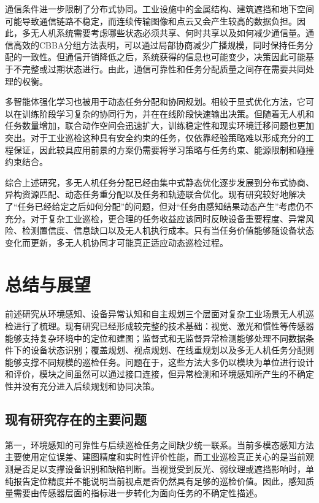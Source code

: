 通信条件进一步限制了分布式协同。工业设施中的金属结构、建筑遮挡和地下空间可能导致通信链路不稳定，而连续传输图像和点云又会产生较高的数据负担。因此，多无人机系统需要考虑哪些状态必须共享、何时共享以及如何减少通信量。通信高效的CBBA分组方法表明，可以通过局部协商减少广播规模，同时保持任务分配的一致性\cite{Kim2020,fei2022limitedcomm,pan2024uhcrp}。但通信开销降低之后，系统获得的信息也可能变少，决策因此可能基于不完整或过期状态进行。由此，通信可靠性和任务分配质量之间存在需要共同处理的权衡。

多智能体强化学习也被用于动态任务分配和协同规划。相较于显式优化方法，它可以在训练阶段学习复杂的协同行为，并在在线阶段快速输出决策。但随着无人机和任务数量增加，联合动作空间会迅速扩大，训练稳定性和现实环境迁移问题也更加突出。对于工业巡检这种具有安全约束的任务，仅依靠经验策略难以形成充分的工程保证，因此较具应用前景的方案仍需要将学习策略与任务约束、能源限制和碰撞约束结合\cite{westheider2023multiipp,kulkarni2022teamed}。

综合上述研究，多无人机任务分配已经由集中式静态优化逐步发展到分布式协商、异构资源匹配、动态任务重分配以及任务和轨迹联合优化。现有研究较好地解决了“任务已经给定之后如何分配”的问题，但对“任务由感知结果动态产生”考虑仍不充分。对于复杂工业巡检，更合理的任务收益应该同时反映设备重要程度、异常风险、检测置信度、信息缺口以及无人机执行成本。只有当任务价值能够随设备状态变化而更新，多无人机协同才可能真正适应动态巡检过程。

\section{总结与展望}

前述研究从环境感知、设备异常认知和自主规划三个层面对复杂工业场景无人机巡检进行了梳理。现有研究已经形成较完整的技术基础：视觉、激光和惯性等传感器能够支持复杂环境中的定位和建图；监督式和无监督异常检测能够处理不同数据条件下的设备状态识别；覆盖规划、视点规划、在线重规划以及多无人机任务分配则能够支撑不同规模的巡检任务。问题在于，这些方法大多仍以模块为单位进行设计和评价，模块之间虽然可以通过接口连接，但异常检测和环境感知所产生的不确定性并没有充分进入后续规划和协同决策。

\subsection{现有研究存在的主要问题}

第一，环境感知的可靠性与后续巡检任务之间缺少统一联系。当前多模态感知方法主要使用定位误差、建图精度和实时性评价性能，而工业巡检真正关心的是当前观测是否足以支撑设备识别和缺陷判断。当视觉受到反光、弱纹理或遮挡影响时，单纯报告定位精度并不能说明当前视点是否仍然具有足够的巡检价值。因此，感知质量需要由传感器层面的指标进一步转化为面向任务的不确定性描述。

